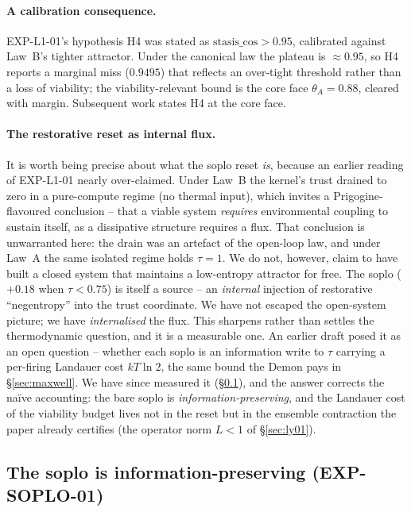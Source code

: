 \documentclass[11pt, a4paper]{article}
\begin{document}
\paragraph{A calibration consequence.}
EXP-L1-01's hypothesis H4 was stated as $\text{stasis\_cos} > 0.95$, calibrated
against Law~B's tighter attractor. Under the canonical law the plateau is
$\approx 0.95$, so H4 reports a marginal miss ($0.9495$) that reflects an
over-tight threshold rather than a loss of viability; the viability-relevant
bound is the core face $\theta_A = 0.88$, cleared with margin. Subsequent work
states H4 at the core face.

\paragraph{The restorative reset as internal flux.}
It is worth being precise about what the soplo reset \emph{is}, because an
earlier reading of EXP-L1-01 nearly over-claimed. Under Law~B the kernel's trust
drained to zero in a pure-compute regime (no thermal input), which invites a
Prigogine-flavoured conclusion -- that a viable system \emph{requires}
environmental coupling to sustain itself, as a dissipative structure requires a
flux. That conclusion is unwarranted here: the drain was an artefact of the
open-loop law, and under Law~A the same isolated regime holds $\tau = 1$. We do
not, however, claim to have built a closed system that maintains a low-entropy
attractor for free. The soplo ($+0.18$ when $\tau < 0.75$) is itself a source --
an \emph{internal} injection of restorative ``negentropy'' into the trust
coordinate. We have not escaped the open-system picture; we have
\emph{internalised} the flux. This sharpens rather than settles the
thermodynamic question, and it is a measurable one. An earlier draft posed it as
an open question -- whether each soplo is an information write to $\tau$ carrying
a per-firing Landauer cost $kT\ln 2$, the same bound the Demon pays in
\S\ref{sec:maxwell}. We have since measured it (\S\ref{sec:soplo}), and the answer
corrects the naïve accounting: the bare soplo is \emph{information-preserving}, and
the Landauer cost of the viability budget lives not in the reset but in the
ensemble contraction the paper already certifies (the operator norm $L<1$ of
\S\ref{sec:ly01}).

\subsection{The soplo is information-preserving (EXP-SOPLO-01)}
\label{sec:soplo}
\end{document}
